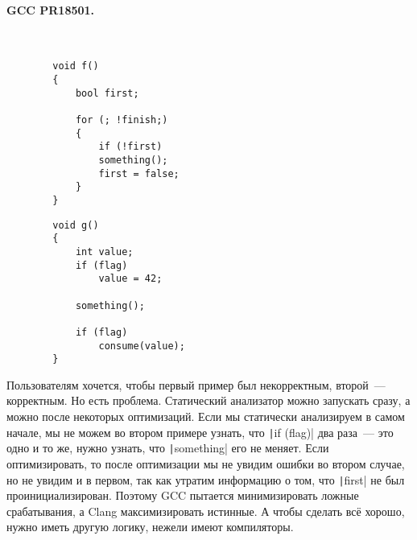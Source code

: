 \documentclass{article}
\begin{document}
    \paragraph{GCC PR18501.}\mbox{}\\
    \begin{multicols}{2}
    \begin{verbatim}
        void f()
        {
            bool first;

            for (; !finish;)
            {
                if (!first)
                something();
                first = false;
            }
        }
    \end{verbatim}
    \columnbreak
    \begin{verbatim}
        void g()
        {
            int value;
            if (flag)
                value = 42;

            something();

            if (flag)
                consume(value);
        }
    \end{verbatim}
    \end{multicols}\noindent
    Пользователям хочется, чтобы первый пример был некорректным, второй~--- корректным. Но есть проблема. Статический анализатор можно запускать сразу, а можно после некоторых оптимизаций. Если мы статически анализируем в самом начале, мы не можем во втором примере узнать, что \texttt|if (flag)| два раза~--- это одно и то же, нужно узнать, что \texttt|something| его не меняет. Если оптимизировать, то после оптимизации мы не увидим ошибки во втором случае, но не увидим и в первом, так как утратим информацию о том, что \texttt|first| не был проинициализирован. Поэтому GCC пытается минимизировать ложные срабатывания, а Clang максимизировать истинные. А чтобы сделать всё хорошо, нужно иметь другую логику, нежели имеют компиляторы.
\end{document}

